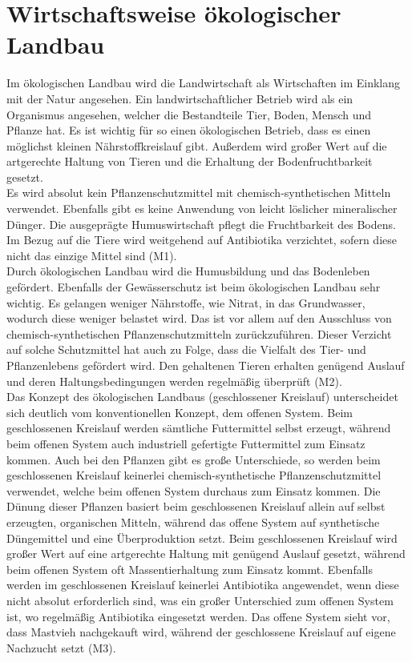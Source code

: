 \documentclass[12pt, a4paper]{report}
\begin{document}
	\bsremovechaptertitle
	\chapter{Wirtschaftsweise ökologischer Landbau}
	Im ökologischen Landbau wird die Landwirtschaft als Wirtschaften im Einklang mit der Natur angesehen.
	Ein landwirtschaftlicher Betrieb wird als ein Organismus angesehen, welcher die Bestandteile Tier, Boden, Mensch und Pflanze hat.
	Es ist wichtig für so einen ökologischen Betrieb, dass es einen möglichst kleinen Nährstoffkreislauf gibt.
	Außerdem wird großer Wert auf die artgerechte Haltung von Tieren und die Erhaltung der Bodenfruchtbarkeit gesetzt. \\
	Es wird absolut kein Pflanzenschutzmittel mit chemisch-synthetischen Mitteln verwendet.
	Ebenfalls gibt es keine Anwendung von leicht löslicher mineralischer Dünger.
	Die ausgeprägte Humuswirtschaft pflegt die Fruchtbarkeit des Bodens.
	Im Bezug auf die Tiere wird weitgehend auf Antibiotika verzichtet, sofern diese nicht das einzige Mittel sind (M1).
	\\
	Durch ökologischen Landbau wird die Humusbildung und das Bodenleben gefördert.
	Ebenfalls der Gewässerschutz ist beim ökologischen Landbau sehr wichtig.
	Es gelangen weniger Nährstoffe, wie Nitrat, in das Grundwasser, wodurch diese weniger belastet wird.
	Das ist vor allem auf den Ausschluss von chemisch-synthetischen Pflanzenschutzmitteln zurückzuführen.
	Dieser Verzicht auf solche Schutzmittel hat auch zu Folge, dass die Vielfalt des Tier- und Pflanzenlebens gefördert wird.
	Den gehaltenen Tieren erhalten genügend Auslauf und deren Haltungsbedingungen werden regelmäßig überprüft (M2).
	\\
	Das Konzept des ökologischen Landbaus (geschlossener Kreislauf) unterscheidet sich deutlich vom konventionellen Konzept, dem offenen System.
	Beim geschlossenen Kreislauf werden sämtliche Futtermittel selbst erzeugt, während beim offenen System auch industriell gefertigte Futtermittel zum Einsatz kommen.
	Auch bei den Pflanzen gibt es große Unterschiede, so werden beim geschlossenen Kreislauf keinerlei chemisch-synthetische Pflanzenschutzmittel verwendet, welche beim offenen System durchaus zum Einsatz kommen.
	Die Dünung dieser Pflanzen basiert beim geschlossenen Kreislauf allein auf selbst erzeugten, organischen Mitteln, während das offene System auf synthetische Düngemittel und eine Überproduktion setzt.
	Beim geschlossenen Kreislauf wird großer Wert auf eine artgerechte Haltung mit genügend Auslauf gesetzt, während beim offenen System oft Massentierhaltung zum Einsatz kommt.
	Ebenfalls werden im geschlossenen Kreislauf keinerlei Antibiotika angewendet, wenn diese nicht absolut erforderlich sind, was ein großer Unterschied zum offenen System ist, wo regelmäßig Antibiotika eingesetzt werden.
	Das offene System sieht vor, dass Mastvieh nachgekauft wird, während der geschlossene Kreislauf auf eigene Nachzucht setzt (M3).
\end{document}

